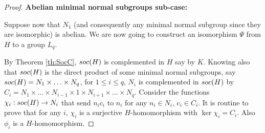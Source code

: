 \begin{proof}
    \vspace{\baselineskip}
    \noindent
    \textbf{Abelian minimal normal subgroups sub-case:}
    \vspace{\baselineskip}

    Suppose now that $N_1$ (and consequently any minimal normal subgroup since they are isomorphic) is abelian. We are now going to construct an isomorphism $\Psi$ from $H$ to a group $L_q$.

    By Theorem \ref{th:SocC}, $soc {(H)}$ is complemented in $H$ say by $K$.
    Knowing also that $soc {(H)}$ is the direct product of some minimal normal subgroups, say $soc {(H)} = N_1 \times\ldots \times N_q$, for $1 \le i \le q$, $N_i$ is complemented in $soc {(H)}$ by $C_i = N_1 \times \ldots  \times N_{i-1} \times 1 \times N_{i+1} \times \ldots  \times N_q$.
    Consider the functions $\chi_i : soc {(H)} \rightarrow N_i$ that send $n_ic_i$ to $n_i$ for any $n_i \in N_i$, $c_i \in C_i$.
    It is routine to prove that for any $i$, $\chi_i$ is a surjective $H$-homomorphism with $\ker \chi_i = C_i$. Also $\phi_i$ is a $H$-homomorphism. 
    

\end{proof}
